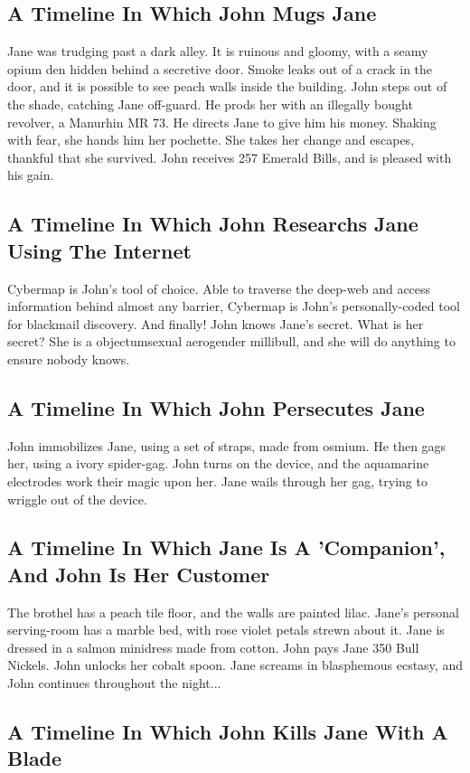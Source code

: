 \documentclass{article}
\begin{document}
\subsection{A Timeline In Which John Mugs Jane}


Jane was trudging past a dark alley.
It is ruinous and gloomy, with a seamy opium den hidden behind a secretive door.
Smoke leaks out of a crack in the door, and it is possible to see peach walls inside the building.
John steps out of the shade, catching Jane off{-}guard.
He prods her with an illegally bought revolver, a Manurhin MR 73.
He directs Jane to give him his money.
Shaking with fear, she hands him her pochette.
She takes her change and escapes, thankful that she survived.
John receives 257 Emerald Bills, and is pleased with his gain.
\subsection{A Timeline In Which John Researchs Jane Using The Internet}


Cybermap is John's tool of choice. Able to traverse the deep{-}web and access information behind almost any barrier, Cybermap is John's personally{-}coded tool for blackmail discovery.
And finally!
John knows Jane's secret. What is her secret? She is a objectumsexual aerogender millibull, and she will do anything to ensure nobody knows.
\subsection{A Timeline In Which John Persecutes Jane}


John immobilizes Jane, using a set of straps, made from osmium.
He then gags her, using a ivory spider{-}gag.
John turns on the device, and the aquamarine electrodes work their magic upon her.
Jane wails through her gag, trying to wriggle out of the device.
\subsection{A Timeline In Which Jane Is A 'Companion', And John Is Her Customer}


The brothel has a peach tile floor, and the walls are painted lilac.
Jane's personal serving{-}room has a marble bed, with rose violet petals strewn about it.
Jane is dressed in a salmon minidress made from cotton.
John pays Jane 350 Bull Nickels.
John unlocks her cobalt spoon.
Jane screams in blasphemous ecstasy, and John continues throughout the night...
\subsection{A Timeline In Which John Kills Jane With A Blade}
\end{document}
